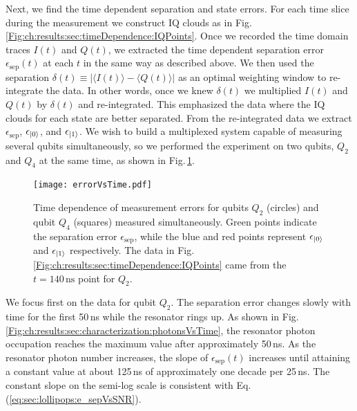 Next, we find the time dependent separation and state errors.
For each time slice during the measurement we construct IQ clouds as in Fig.\,\ref{Fig:ch:results:sec:timeDependence:IQPoints}.
Once we recorded the time domain traces $I(t)$ and $Q(t)$, we extracted the time dependent separation error $\epsilon_{\text{sep}}(t)$ at each $t$ in the same way as described above.
We then used the separation $\delta(t) \equiv \left| \langle I(t) \rangle - \langle Q(t) \rangle \right|$ as an optimal weighting window to re-integrate the data.
In other words, once we knew $\delta(t)$ we multiplied $I(t)$ and $Q(t)$ by $\delta(t)$ and re-integrated.
This emphasized the data where the IQ clouds for each state are better separated.
From the re-integrated data we extract $\epsilon_{\text{sep}}$, $\epsilon_{|0\rangle}$, and $\epsilon_{|1\rangle}$.
We wish to build a multiplexed system capable of measuring several qubits simultaneously, so we performed the experiment on two qubits, $Q_2$ and $Q_4$ at the same time, as shown in Fig.\,\ref{Fig:ch:results:sec:timeDependence:errorVsTime}.

\begin{figure}
\begin{centering}
\texttt{[image: errorVsTime.pdf]}
\par\end{centering}
\caption{Time dependence of measurement errors for qubits $Q_2$ (circles) and qubit $Q_4$ (squares) measured simultaneously. Green points indicate the separation error $\epsilon_{\text{sep}}$, while the blue and red points represent $\epsilon_{|0\rangle}$ and $\epsilon_{|1\rangle}$ respectively. The data in Fig.\,\ref{Fig:ch:results:sec:timeDependence:IQPoints} came from the $t=140\,\text{ns}$ point for $Q_2$.}
\label{Fig:ch:results:sec:timeDependence:errorVsTime}
\end{figure}

We focus first on the data for qubit $Q_2$. The separation error changes slowly with time for the first 50\,ns while the resonator rings up.
As shown in Fig.\,\ref{Fig:ch:results:sec:characterization:photonsVsTime}, the resonator photon occupation reaches the maximum value after approximately 50\,ns.
As the resonator photon number increases, the slope of $\epsilon_{\text{sep}}(t)$ increases until attaining a constant value at about 125\,ns of approximately one decade per 25\,ns.
The constant slope on the semi-log scale is consistent with Eq.\,(\ref{eq:sec:lollipops:e_sepVsSNR}).

